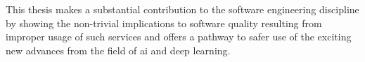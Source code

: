 \medskip\noindent
This thesis makes a substantial contribution to the software engineering discipline by showing the non-trivial implications to software quality resulting from improper usage of such services and offers a pathway to safer use of the exciting new advances from the field of \gls{ai} and deep learning.


\vspace*{\fill}
\normalsize


